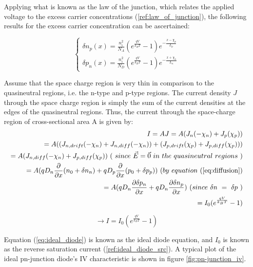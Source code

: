 Applying what is known as the law of the junction, which relates the applied voltage to the excess carrier concentrations (\ref{ref:law_of_junction}), the following results for the excess carrier concentration can be ascertained:

\begin{equation}
	\label{eq:excess_conc_ideal_diode}
	\begin{cases}
		\delta n_p(x) = \frac{n_i^2}{N_A}(e^{\frac{qV}{k_BT}} - 1)e^{-\frac{x-\chi_p}{L_{p}}} \\
		\delta p_n(x) = \frac{n_i^2}{N_D}(e^{\frac{qV}{k_BT}} - 1)e^{-\frac{x+\chi_n}{L_{n}}}
	\end{cases}
\end{equation}

Assume that the space charge region is very thin in comparison to the quasineutral regions, i.e. the n-type and p-type regions. The current density $J$ through the space charge region is simply the sum of the current densities at the edges of the quasineutral regions. Thus, the current through the space-charge region of cross-sectional area A is given by:
\begin{align*}
	\label{eq:current_dens_ideal_diode}
		I = AJ = A(J_n(-\chi _n) + J_p(\chi _p)) \\
		       = A( (J_{n,drift}(-\chi _n) + J_{n,diff}(-\chi _n)) + (J_{p,drift}(\chi _p) + J_{p,diff}(\chi _p)) ) \\
		       = A( J_{n,diff}(-\chi _n) + J_{p,diff}(\chi _p) ) \ ( \ since \ \vec{E} = \vec{0} \ in \ the \ quasineutral \ regions \ ) \\
		       = A( qD_n\frac{\partial}{\partial x}(n_0 + \delta n_n) + qD_p\frac{\partial}{\partial x}(p_0 + \delta p_p)) \ ( by \ equation \ (\ref{eq:diffusion}) \\
		       = A( qD_n\frac{\partial \delta p_n}{\partial x} + qD_n\frac{\partial \delta n_p}{\partial x} ) \ ( since \ \delta n \ = \ \delta p \ ) \\
		       = I_0( e^{\frac{qV}{k_BT}} - 1 )
\end{align*}

\begin{equation}
	\label{eq:ideal_diode}
	\rightarrow I = I_0( e^{\frac{qV}{k_BT}} - 1 )
\end{equation}

Equation (\ref{eq:ideal_diode}) is known as the ideal diode equation, and $I_0$ is known as the reverse saturation current (\ref{ref:ideal_diode_src}). A typical plot of the ideal pn-junction diode's IV characteristic is shown in figure \ref{fig:pn-junction_iv}.

